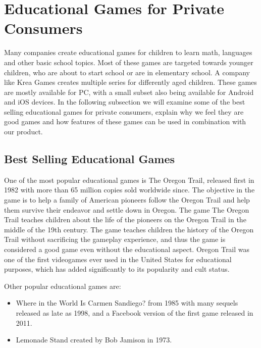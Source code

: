 \section{Educational Games for Private Consumers}
\label{sec:privateconsumers}
Many companies create educational games for children to learn math, languages and other basic school topics.
Most of these games are targeted towards younger children, who are about to start school or are in elementary school.
A company like Krea Games \cite{kreagames} creates multiple series for differently aged children.
These games are mostly available for PC, with a small subset also being available for Android and iOS devices.
In the following subsection we will examine some of the best selling educational games for private consumers, explain why we feel they are good games 
and how features of these games can be used in combination with our product.

\subsection{Best Selling Educational Games}
One of the most popular educational games is The Oregon Trail, released first in 1982 with more than 65 million copies sold worldwide since.\cite{
oregontrail} The objective in the game is to help a family of American pioneers follow the Oregon Trail and help them survive their endeavor and settle 
down in Oregon. The game The Oregon Trail teaches children about the life of the pioneers on the Oregon Trail in the middle of the 19th century.
The game teaches children the history of the Oregon Trail without sacrificing the gameplay experience, and thus the game is considered a good game even 
without the educational aspect. Oregon Trail was one of the first videogames ever used in the United States for educational purposes, which has added 
significantly to its popularity and cult status.\newline

Other popular educational games are:
\begin{itemize}
	\item Where in the World Is Carmen Sandiego? from 1985 with many sequels released as late as 1998, and a Facebook version of the first game released in 2011.\cite{carmensandiego}
	\item Lemonade Stand created by Bob Jamison in 1973.\cite{lemonadestand}
\end{itemize}

